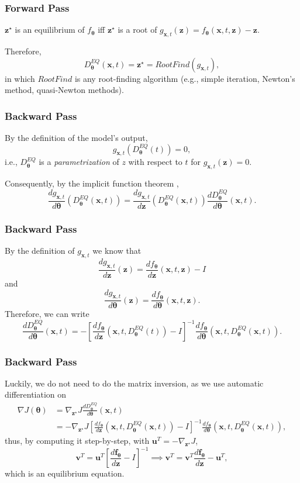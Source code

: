 \documentclass[t]{beamer}
\begin{document}
\begin{frame}
    \frametitle{Forward Pass}
    $\bm{z}^{\star}$ is an equilibrium of $f_{\bm{\theta}}$ iff $\bm{z}^{\star}$ is a root of $g_{\bm{x},t}(\bm{z}) = f_{\bm{\theta}}(\bm{x},t,\bm{z}) - \bm{z}$.
    \linebreak \pause

    Therefore, \[
	D^{EQ}_{\bm{\theta}}(\bm{x},t) = \bm{z}^{\star} = RootFind(g_{\bm{x},t})
    ,\] in which $RootFind$ is any root-finding algorithm (e.g., simple iteration, Newton's method, quasi-Newton methods).
\end{frame}

\begin{frame}
    \frametitle{Backward Pass}
    By the definition of the model's output, \[
	g_{\bm{x},t}(D^{EQ}_{\bm{\theta}}(t)) = 0
    ,\] i.e., $D^{EQ}_{\bm{\theta}}$ is a \emph{parametrization} of $z$ with respect to $t$ for $g_{\bm{x},t}(\bm{z})=0$.
    \linebreak \pause

    Consequently, by the implicit function theorem \cite{Bai2019}, \[
	\frac{d g_{\bm{x},t}}{d \bm{\theta}}(D^{EQ}_{\bm{\theta}}(\bm{x},t)) = \frac{d g_{\bm{x},t}}{d \bm{z}}(D^{EQ}_{\bm{\theta}}(\bm{x},t)) \frac{d D^{EQ}_{\bm{\theta}}}{d \bm{\theta}}(\bm{x},t)
    .\] 
\end{frame}

\begin{frame}
    \frametitle{Backward Pass}
    
    By the definition of $g_{\bm{x},t}$ we know that \[
	\frac{d g_{\bm{x},t}}{d \bm{z}}(\bm{z}) = \frac{d f_{\bm{\theta}}}{d \bm{z}}(\bm{x},t,\bm{z}) - I 
    \] and \[
    \frac{d g_{\bm{x},t}}{d \bm{\theta}}(\bm{z}) = \frac{d f_{\bm{\theta}}}{d \bm{\theta}}(\bm{x},t,\bm{z})
    .\] Therefore, we can write \[
    \frac{d D^{EQ}_{\bm{\theta}}}{d \bm{\theta}}(\bm{x},t) = - \left[ \frac{d f_{\bm{\theta}}}{d \bm{z}}(\bm{x},t,D^{EQ}_{\bm{\theta}}(t)) - I \right]^{-1} \frac{d f_{\bm{\theta}}}{d \bm{\theta}}(\bm{x},t,D^{EQ}_{\bm{\theta}}(\bm{x},t))
    .\] 
\end{frame}

\begin{frame}
    \frametitle{Backward Pass}

    Luckily, we do not need to do the matrix inversion, as we use automatic differentiation on
    \begin{align*}
	\nabla J\left( \bm{\theta} \right) &= \nabla_{\bm{z}^{\star}} J \frac{d D^{EQ}_{\bm{\theta}}}{d \bm{\theta}}(\bm{x},t) \\
	&= - \nabla_{\bm{z}^{\star}} J \left[ \frac{d f_{\bm{\theta}}}{d \bm{z}}(\bm{x},t,D^{EQ}_{\bm{\theta}}(\bm{x},t)) - I \right]^{-1} \frac{d f_{\bm{\theta}}}{d \bm{\theta}}(\bm{x},t,D^{EQ}_{\bm{\theta}}(\bm{x},t)),
    \end{align*}\pause
    thus, by computing it step-by-step, with $\bm{u}^T=- \nabla_{\bm{z}^{\star}} J$, \[
	\bm{v}^T = \bm{u}^T\left[ \frac{d \bm{f}_{\bm{\theta}}}{d \bm{z}} - I \right]^{-1} \implies \bm{v}^T = \bm{v}^T \frac{d \bm{f}_{\bm{\theta}}}{d \bm{z}} - \bm{u}^T
    ,\] which is an equilibrium equation.
\end{frame}
\end{document}
